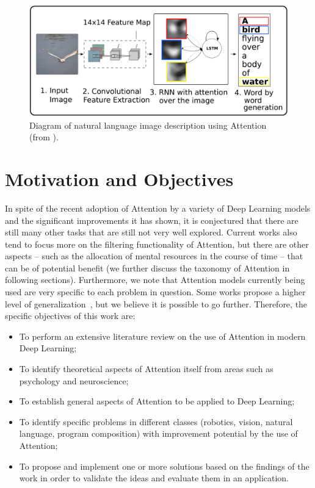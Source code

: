 \documentclass[English]{style/ic-tese-v3}
\begin{document}
\begin{figure}
\begin{center}
	\includegraphics[width=0.9\linewidth]{./img/img_captioning.png}
\caption{
    Diagram of natural language image description using Attention
    (from \cite{ref:img-captioning}).
}
\label{fig:description}
\end{center}
\end{figure}

\section{Motivation and Objectives}
In spite of the recent adoption of Attention by a variety of Deep Learning models
and the significant improvements it has shown, it is conjectured that there are still many other tasks
that are still not very well explored.
Current works also tend to focus more on the filtering functionality of Attention,
but there are other aspects
-- such as the allocation of mental resources in the course of time -- that can be of potential benefit
(we further discuss the taxonomy of Attention in following sections).
Furthermore, we note that Attention models currently being used
are very specific to each problem in question.
Some works propose a higher level of generalization~\cite{ref:recurr-models},
but we believe it is possible to go further.
Therefore, the specific objectives of this work are:
\begin{itemize}
    \item To perform an extensive literature review on the use of Attention
        in modern Deep Learning;
    \item To identify theoretical aspects of Attention itself from areas such as psychology and neuroscience;
    \item To establish general aspects of Attention to be applied to Deep Learning;
    \item To identify specific problems in different classes
        (robotics, vision, natural language, program composition) with
        improvement potential by the use of Attention;
    \item To propose and implement one or more solutions based on the findings of the work in order to
        validate the ideas and evaluate them in an application.
\end{itemize}
\end{document}
